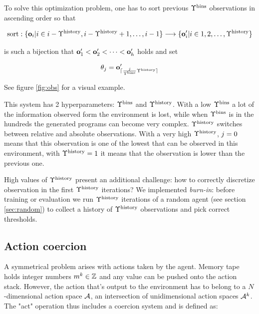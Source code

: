 To solve this optimization problem, one has to sort previous $\Upsilon^\text{bins}$ observations in ascending order so that 

\begin{equation}
    \text{sort}: \{\mathbf{o}_i | i \in i-\Upsilon^\text{history},i-\Upsilon^\text{history}+1,\dots,i-1\} \longrightarrow \{ \mathbf{o}'_i | i \in 1,2,\dots,\Upsilon^\text{history} \}
\end{equation}

is such a bijection that $\mathbf{o}'_1 < \mathbf{o}'_2 < \dots < \mathbf{o}'_h$ holds and set

\begin{equation}
    \theta_{j} = \mathbf{o}'_{\lceil \frac{j}{\Upsilon^\text{bins}} \Upsilon^\text{history} \rceil}
\end{equation}

See figure \ref{fig:obs} for a visual example.


This system has 2 hyperparameters: $\Upsilon^\text{bins}$ and $\Upsilon^\text{history}$.
With a low $\Upsilon^\text{bins}$ a lot of the information observed form the environment is lost, while when $\Upsilon^\text{bins}$ is in the hundreds the generated programs can become very complex.
$\Upsilon^\text{history}$ switches between relative and absolute observations.
With a very high $\Upsilon^\text{history}$, $j=0$ means that this observation is one of the lowest that can be observed in this environment, with $\Upsilon^\text{history}=1$ it means that the observation is lower than the previous one.

High values of $\Upsilon^\text{history}$ present an additional challenge: how to correctly discretize observation in the first $\Upsilon^\text{history}$ iterations?
We implemented \textit{burn-in}: before training or evaluation we run $\Upsilon^\text{history}$ iterations of a random agent (see section \ref{sec:random}) to collect a history of $\Upsilon^\text{history}$ observations and pick correct thresholds.

\newpage
\subsection{Action coercion}
\label{sec:act}

A symmetrical problem arises with actions taken by the agent. 
Memory tape holds integer numbers $m^k \in \mathbb{Z}$ and any value can be pushed onto the action stack.
However, the action that's output to the environment has to belong to a $N$-dimensional action space $\mathcal{A}$, an intersection of unidimensional action spaces $\mathcal{A}^k$.
The "act" operation thus includes a coercion system and is defined as:

